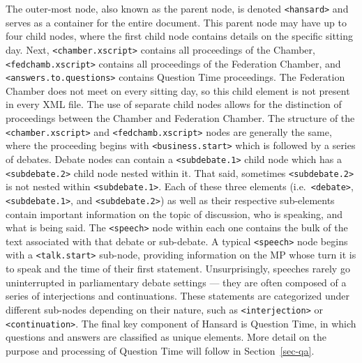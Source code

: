 \documentclass[
  letterpaper,
  DIV=11,
  numbers=noendperiod]{scrartcl}
\begin{document}
The outer-most node, also known as the parent node, is denoted
\texttt{\textless{}hansard\textgreater{}} and serves as a container for
the entire document. This parent node may have up to four child nodes,
where the first child node contains details on the specific sitting day.
Next, \texttt{\textless{}chamber.xscript\textgreater{}} contains all
proceedings of the Chamber,
\texttt{\textless{}fedchamb.xscript\textgreater{}} contains all
proceedings of the Federation Chamber, and
\texttt{\textless{}answers.to.questions\textgreater{}} contains Question
Time proceedings. The Federation Chamber does not meet on every sitting
day, so this child element is not present in every XML file. The use of
separate child nodes allows for the distinction of proceedings between
the Chamber and Federation Chamber. The structure of the
\texttt{\textless{}chamber.xscript\textgreater{}} and
\texttt{\textless{}fedchamb.xscript\textgreater{}} nodes are generally
the same, where the proceeding begins with
\texttt{\textless{}business.start\textgreater{}} which is followed by a
series of debates. Debate nodes can contain a
\texttt{\textless{}subdebate.1\textgreater{}} child node which has a
\texttt{\textless{}subdebate.2\textgreater{}} child node nested within
it. That said, sometimes \texttt{\textless{}subdebate.2\textgreater{}}
is not nested within \texttt{\textless{}subdebate.1\textgreater{}}. Each
of these three elements (i.e.~\texttt{\textless{}debate\textgreater{}},
\texttt{\textless{}subdebate.1\textgreater{}}, and
\texttt{\textless{}subdebate.2\textgreater{}}) as well as their
respective sub-elements contain important information on the topic of
discussion, who is speaking, and what is being said. The
\texttt{\textless{}speech\textgreater{}} node within each one contains
the bulk of the text associated with that debate or sub-debate. A
typical \texttt{\textless{}speech\textgreater{}} node begins with a
\texttt{\textless{}talk.start\textgreater{}} sub-node, providing
information on the MP whose turn it is to speak and the time of their
first statement. Unsurprisingly, speeches rarely go uninterrupted in
parliamentary debate settings --- they are often composed of a series of
interjections and continuations. These statements are categorized under
different sub-nodes depending on their nature, such as
\texttt{\textless{}interjection\textgreater{}} or
\texttt{\textless{}continuation\textgreater{}}. The final key component
of Hansard is Question Time, in which questions and answers are
classified as unique elements. More detail on the purpose and processing
of Question Time will follow in Section~\ref{sec-qa}.
\end{document}
